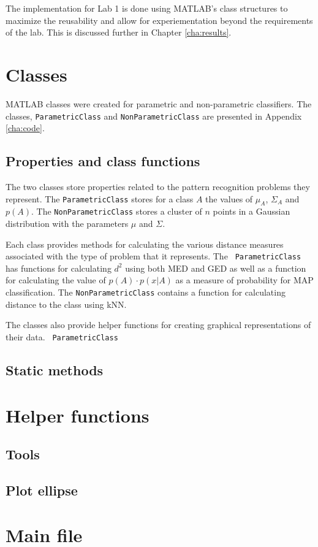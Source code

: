 The implementation for Lab 1 is done using MATLAB's class structures to
maximize the reusability and allow for experiementation beyond the requirements
of the lab. This is discussed further in Chapter \ref{cha:results}.

\section{Classes}
MATLAB classes were created for parametric and non-parametric classifiers. The
classes, {\tt ParametricClass} and {\tt NonParametricClass} are presented in
Appendix \ref{cha:code}.
\subsection{Properties and class functions}
The two classes store properties related to the pattern recognition problems
they represent. The {\tt ParametricClass} stores for a class $A$ the values of
$\mu_A$, $\Sigma_A$ and $p(A)$. The {\tt NonParametricClass} stores a cluster
of $n$ points in a Gaussian distribution with the parameters $\mu$
and $\Sigma$.

Each class provides methods for calculating the various distance measures
associated with the type of problem that it represents. The {\tt
ParametricClass} has functions for calculating $d^2$ using both MED and GED as
well as a function for calculating the value of $p(A) \cdot p(x|A)$ as a
measure of probability for MAP classification. The {\tt NonParametricClass} contains a
function for calculating distance to the class using kNN.

The classes also provide helper functions for creating graphical
representations of their data. {\tt
ParametricClass}

\subsection{Static methods}

\section{Helper functions}
\subsection{Tools}
\subsection{Plot ellipse}

\section{Main file}
